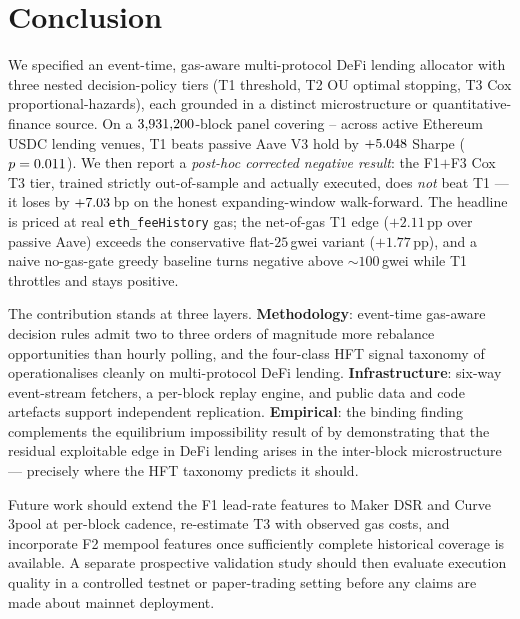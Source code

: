 \section{Conclusion}
\label{sec:conclusion}

We specified an event-time, gas-aware multi-protocol DeFi lending
allocator with three nested decision-policy tiers (T1 threshold,
T2 OU optimal stopping, T3 Cox proportional-hazards), each
grounded in a distinct microstructure or quantitative-finance
source.  On a $3{,}931{,}200$-block panel covering
\DataStart{}--\DataEnd{} across \NProtocols{} active Ethereum
USDC lending venues, T1 beats passive Aave V3 hold by
$+5.048$ Sharpe ($p = 0.011$).  We then report a
\emph{post-hoc corrected negative result}: the F1$+$F3 Cox T3 tier,
trained strictly out-of-sample and actually executed, does
\emph{not} beat T1 --- it loses by $+7.03$\,bp on the
honest expanding-window walk-forward.  The headline is priced at real
\texttt{eth\_feeHistory} gas; the net-of-gas T1 edge ($+2.11$\,pp over
passive Aave) exceeds the conservative flat-$25$\,gwei variant
($+1.77$\,pp), and a naive no-gas-gate greedy baseline turns negative
above $\sim 100$\,gwei while T1 throttles and stays positive.

The contribution stands at three layers.  \textbf{Methodology}:
event-time gas-aware decision rules admit two to three orders of
magnitude more rebalance opportunities than hourly polling, and
the four-class HFT signal taxonomy of \cite{mackenzie2021}
operationalises cleanly on multi-protocol DeFi lending.
\textbf{Infrastructure}: six-way event-stream fetchers, a
per-block replay engine, and public data and code artefacts support
independent replication.  \textbf{Empirical}: the binding
finding complements the equilibrium impossibility result of
\cite{halpern2024fair} by demonstrating that the residual
exploitable edge in DeFi lending arises in the inter-block
microstructure --- precisely where the HFT taxonomy predicts it
should.

Future work should extend the F1 lead-rate features to Maker DSR
and Curve 3pool at per-block cadence, re-estimate T3 with observed
gas costs, and incorporate F2 mempool features once sufficiently
complete historical coverage is available.  A separate prospective
validation study should then evaluate execution quality in a
controlled testnet or paper-trading setting before any claims are
made about mainnet deployment.
